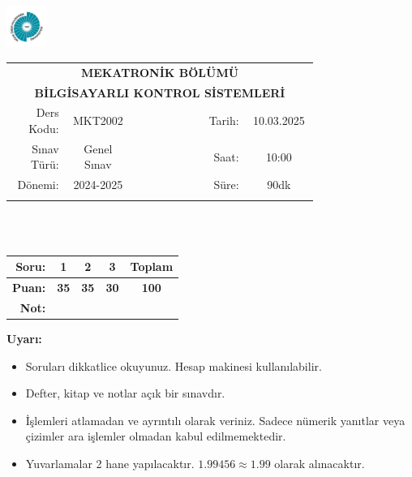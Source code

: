 \newcommand\UniversiteAdi{Niğde Ömer Halisdemir Üniversitesi}
\newcommand\BolumAdi{MEKATRONİK BÖLÜMÜ}
\newcommand\DersKodu{MKT2002}
\newcommand\DersAdi{BİLGİSAYARLI KONTROL SİSTEMLERİ}
\newcommand\SinavAdi{Genel Sınav}
\newcommand\SinavTarihi{10.03.2025}
\newcommand\SinavSaati{10:00}
\newcommand\SinavSuresi{90dk}

\pagestyle{fancy}
\fancyhf{} %
\noindent \includegraphics[width=0.1\textwidth]{logo}
\begin{tabular}{
    p{0.15\linewidth}
    p{0.15\linewidth}
    p{0.2\linewidth}
    p{0.1\linewidth}
    p{0.15\linewidth}}
    \multicolumn{5}{c}{\textbf{\BolumAdi}}\\
    \multicolumn{5}{c}{\textbf{\DersAdi}}\\\hline
    \multicolumn{1}{|r|}{Ders Kodu:}&
    \multicolumn{1}{|c|}{\DersKodu}&
    \multicolumn{1}{|c|}{}& 
    \multicolumn{1}{|r|}{Tarih:}&
    \multicolumn{1}{|c|}{\SinavTarihi} \\\hline
    \multicolumn{1}{|r|}{Sınav Türü:}&
    \multicolumn{1}{|c|}{\SinavAdi}&  
    \multicolumn{1}{|c|}{}&
    \multicolumn{1}{|r|}{Saat:}&
    \multicolumn{1}{|c|}{\SinavSaati}\\\hline
    \multicolumn{1}{|r|}{Dönemi:}&
    \multicolumn{1}{|c|}{2024-2025}&
    \multicolumn{1}{|c|}{}&
    \multicolumn{1}{|r|}{Süre:}&
    \multicolumn{1}{|c|}{\SinavSuresi} \\\hline
    &&&&\\
\end{tabular}\\\\
\noindent\begin{center}
\begin{tabular}{|r|c|c|c|c|}\hline
    \textbf{Soru:}&
    \textbf{1}&
    \textbf{2}&
    \textbf{3}&
    \textbf{Toplam}\\\hline
    \textbf{Puan:}&
    \textbf{35}&
    \textbf{35}&
    \textbf{30}&
    \textbf{100}\\\hline
    \textbf{Not:}&&&&\\\hline
\end{tabular}\end{center}
\noindent\textbf{Uyarı:}
\begin{itemize}\bfseries
    \item Soruları dikkatlice okuyunuz. Hesap makinesi kullanılabilir.
    \item Defter, kitap ve notlar açık bir sınavdır.
    \item İşlemleri atlamadan ve ayrıntılı olarak veriniz. Sadece nümerik yanıtlar veya çizimler ara işlemler olmadan kabul edilmemektedir.
    \item Yuvarlamalar 2 hane yapılacaktır. $\mathbf{1.99456\approx1.99}$ olarak alınacaktır.
\end{itemize}


